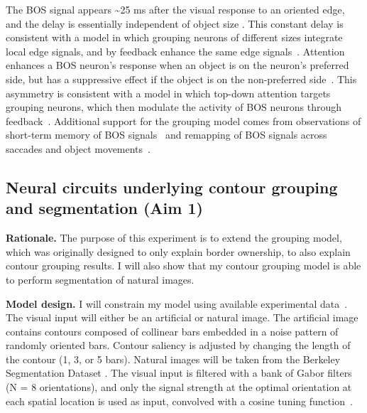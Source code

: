 \documentclass[11pt,notitlepage]{article}
\newcommand{\ie}[0]{{\em i.e.}\xspace}
\begin{document}
The BOS signal appears \textasciitilde 25 ms after the visual response
to an oriented edge, and the delay is essentially independent of
object size \citep{Zhou_etal00}. This constant delay is consistent with a model in which
grouping neurons of different sizes integrate local edge signals, and
by feedback enhance the same edge
signals~\citep{Craft_etal07}. Attention enhances a BOS neuron's
response when an object is on the neuron's preferred side, but has a
suppressive effect if the object is on the non-preferred
side~\citep{Qiu_etal07}. This asymmetry is consistent with a model in
which top-down attention targets grouping neurons, which then modulate
the activity of BOS neurons through
feedback~\citep{Mihalas_etal11b}. Additional support for the grouping
model comes from observations of short-term memory of BOS
signals~\citep{OHerron_vonderHeydt09} and remapping of BOS signals
across saccades and object
movements~\citep{OHerron_vonderHeydt13}.

\subsection{Neural circuits underlying contour grouping and segmentation (Aim 1)}
\textbf{Rationale.} The purpose of this experiment is to extend the grouping model, which was originally designed to only explain border ownership, to also explain contour grouping results. I will also show that my contour grouping model is able to perform segmentation of natural images.

\textbf{Model design.} I will constrain my model using available experimental data~\citep{Qiu_etal07, Chen_etal14}. The visual input will either be an artificial or natural image. The artificial image
    contains contours composed of collinear bars embedded in a noise
    pattern of randomly oriented bars.
Contour saliency is adjusted by changing the length of the contour (1,
3, or 5 bars). Natural images will be taken
    from the Berkeley Segmentation Dataset
    \citep{Martin_etal01}.
The visual input is filtered with a bank of Gabor filters (N = 8 orientations), and only the signal strength at the optimal orientation
at each spatial location is used as input, convolved with a cosine
tuning function~\citep{Piech_etal13}. 
\end{document}
